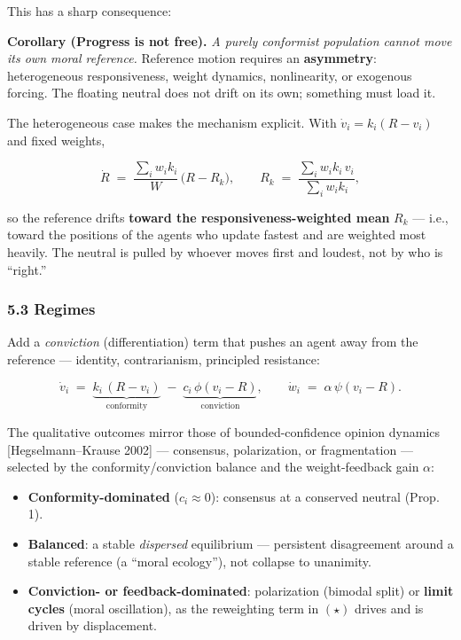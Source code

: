 \documentclass[
]{article}
\providecommand{\tightlist}{%
  \setlength{\itemsep}{0pt}\setlength{\parskip}{0pt}}
\begin{document}
This has a sharp consequence:

\textbf{Corollary (Progress is not free).} \emph{A purely conformist
population cannot move its own moral reference.} Reference motion
requires an \textbf{asymmetry}: heterogeneous responsiveness, weight
dynamics, nonlinearity, or exogenous forcing. The floating neutral does
not drift on its own; something must load it.

The heterogeneous case makes the mechanism explicit. With
\(\dot v_i = k_i(R - v_i)\) and fixed weights,

\[ \dot R \;=\; \frac{\sum_i w_i k_i}{W}\,\bigl(R - R_k\bigr), \qquad R_k \;=\; \frac{\sum_i w_i k_i\, v_i}{\sum_i w_i k_i}, \]

so the reference drifts \textbf{toward the responsiveness-weighted mean}
\(R_k\) --- i.e., toward the positions of the agents who update fastest
and are weighted most heavily. The neutral is pulled by whoever moves
first and loudest, not by who is ``right.''

\subsubsection{5.3 Regimes}\label{regimes}

Add a \emph{conviction} (differentiation) term that pushes an agent away
from the reference --- identity, contrarianism, principled resistance:

\[ \dot v_i \;=\; \underbrace{k_i\,(R - v_i)}_{\text{conformity}} \;-\; \underbrace{c_i\, \phi(v_i - R)}_{\text{conviction}}, \qquad \dot w_i \;=\; \alpha\, \psi(v_i - R) . \]

The qualitative outcomes mirror those of bounded-confidence opinion
dynamics {[}Hegselmann--Krause 2002{]} --- consensus, polarization, or
fragmentation --- selected by the conformity/conviction balance and the
weight-feedback gain \(\alpha\):

\begin{itemize}
\tightlist
\item
  \textbf{Conformity-dominated} (\(c_i \approx 0\)): consensus at a
  conserved neutral (Prop. 1).
\item
  \textbf{Balanced}: a stable \emph{dispersed} equilibrium ---
  persistent disagreement around a stable reference (a ``moral
  ecology''), not collapse to unanimity.
\item
  \textbf{Conviction- or feedback-dominated}: polarization (bimodal
  split) or \textbf{limit cycles} (moral oscillation), as the
  reweighting term in \((\star)\) drives and is driven by displacement.
\end{itemize}
\end{document}
